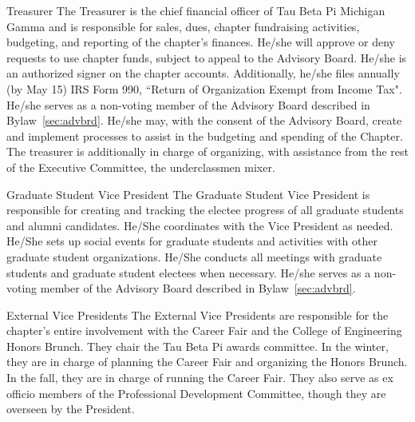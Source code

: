 \begin{enumsubsection}
\item{Treasurer} The Treasurer is  the chief financial officer of Tau Beta Pi Michigan Gamma and is responsible for sales, dues, chapter fundraising activities, budgeting, and reporting of the chapter's finances.  He/she will approve or deny requests to use chapter funds, subject to appeal to the Advisory Board. He/she is an authorized signer on the chapter accounts.  Additionally, he/she files annually (by May 15) IRS Form 990, 
 ``Return of Organization Exempt from Income Tax".  He/she serves as a non-voting member of the Advisory Board described in Bylaw~\ref{sec:advbrd}. He/she may, with the consent of the Advisory Board, create and implement processes to assist in the budgeting and spending of the Chapter. The treasurer is additionally in charge of organizing, with assistance from the rest of the Executive Committee, the underclassmen mixer.

\item{Graduate Student Vice President} The Graduate Student Vice President is responsible for creating and tracking the electee progress of all graduate students and alumni candidates. He/She coordinates with the Vice President as needed. He/She sets up social events for graduate students and activities with other graduate student organizations. He/She conducts all meetings with graduate students and graduate student electees when necessary. He/she serves as a non-voting member of the Advisory Board described in Bylaw~\ref{sec:advbrd}.

\item{External Vice Presidents} The External Vice Presidents are responsible for the chapter's entire involvement with the Career Fair and the College of Engineering Honors Brunch. They chair the Tau Beta Pi awards committee. In the winter, they are in charge of planning the Career Fair and organizing the Honors Brunch. In the fall, they are in charge of running the Career Fair. They also serve as ex officio members of the Professional Development Committee, though they are overseen by the President.
\end{enumsubsection}

